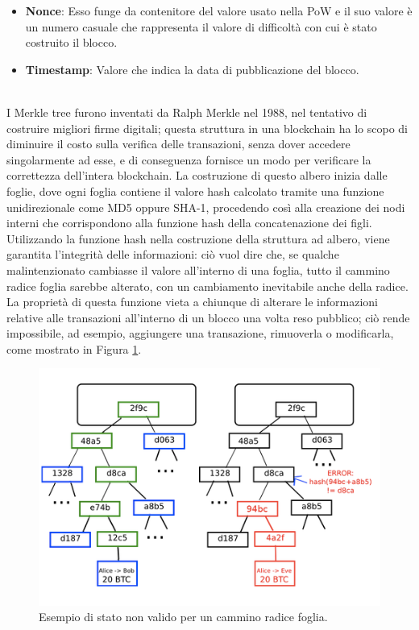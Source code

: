 \begin{itemize}
  \item {\bf Nonce\/}: Esso funge da contenitore del valore usato nella PoW e il suo valore è un numero casuale che rappresenta il valore di difficoltà con cui è stato costruito il blocco.
  \item {\bf Timestamp\/}: Valore che indica la data di pubblicazione del blocco.
\end{itemize}
\leavevmode
\\
I Merkle tree furono inventati da Ralph Merkle nel 1988, nel tentativo di costruire migliori firme digitali; questa struttura in una blockchain ha lo scopo di diminuire il costo sulla verifica delle transazioni, senza dover accedere singolarmente ad esse, e di conseguenza fornisce un modo per verificare la correttezza dell’intera blockchain.
La costruzione di questo albero inizia dalle foglie, dove ogni foglia contiene il valore hash calcolato tramite una funzione unidirezionale come MD5 oppure SHA-1, procedendo così alla creazione dei nodi interni che corrispondono alla funzione hash della concatenazione dei figli.
Utilizzando la funzione hash nella costruzione della struttura ad albero, viene garantita l’integrità delle informazioni: ciò vuol dire che, se qualche malintenzionato cambiasse il valore all’interno di una foglia, tutto il cammino radice foglia sarebbe alterato, con un cambiamento inevitabile anche della radice.
La proprietà di questa funzione vieta a chiunque di alterare le informazioni relative alle transazioni all’interno di un blocco una volta reso pubblico; ciò rende impossibile, ad esempio, aggiungere una transazione, rimuoverla o modificarla, come mostrato in Figura \ref{fig:merkletree}.

\begin{figure}[H]
\begin{center}
\includegraphics[width=0.6\columnwidth]{images/image-merkle-treepng.png}
\end{center}
\caption{Esempio di stato non valido per un cammino radice foglia. \cite{ethereum:paper}}
\label{fig:merkletree}
\end{figure}
